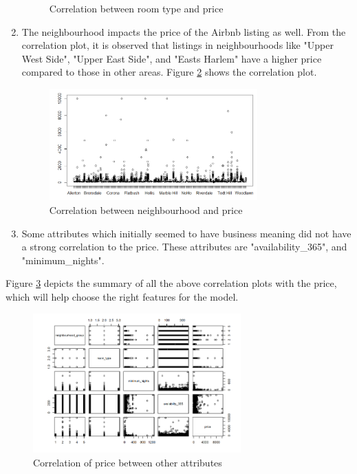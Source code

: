 \documentclass{sig-alternate}
\begin{document}
\begin{enumerate}
\begin{figure}[ht]
			\centering
			\caption{Correlation between room type and price}
			\label{room_type_corr}
		\end{figure}
		\item The neighbourhood impacts the price of the Airbnb listing as well. From the correlation plot, it is observed that listings in neighbourhoods like "Upper West Side", "Upper East Side", and "Easts Harlem" have a higher price compared to those in other areas. Figure \ref{neighborhood_corr} shows the correlation plot.
		\begin{figure}[ht]
			\includegraphics[width=8cm]{neighborhood_corr.png}
			\centering
			\caption{Correlation between neighbourhood and price}
			\label{neighborhood_corr}
		\end{figure}
		\item Some attributes which initially seemed to have business meaning did not have a strong correlation to the price. These attributes are "availability\_365", and "minimum\_nights".
	\end{enumerate}
	Figure \ref{corr} depicts the summary of all the above correlation plots with the price, which will help choose the right features for the model. 
	\begin{figure}[ht]
		\includegraphics[width=8cm]{corr.png}
		\centering
		\caption{Correlation of price between other attributes}
		\label{corr}
	\end{figure}
\end{document}
